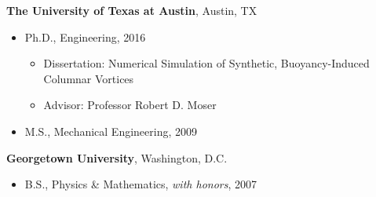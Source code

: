 %
\textbf{The University of Texas at Austin}, 
Austin, TX
\begin{itemize}

\item Ph.D., 
        Engineering, 2016
        \begin{itemize}
        \item Dissertation: Numerical Simulation of Synthetic, 
	      Buoyancy-Induced Columnar Vortices
        \item Advisor: Professor Robert D. Moser
        \end{itemize}

\item M.S., 
        Mechanical Engineering, 2009 

\end{itemize}

\textbf{Georgetown University}, 
Washington, D.C. 
\begin{itemize}

\item B.S., 
        Physics \& Mathematics, \emph{with honors}, 2007
\end{itemize}


